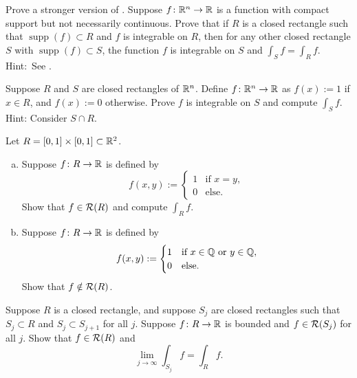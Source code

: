 \begin{exercise}
Prove a stronger version of .
Suppose $f \colon {\mathbb{R}}^n \to {\mathbb{R}}$ is a function with compact support but not
necessarily continuous.
Prove that
if $R$ is a closed rectangle such that $\operatorname{supp}(f) \subset R$
and $f$ is integrable on $R$, then for any other closed rectangle
$S$ with $\operatorname{supp}(f) \subset S$,
the function $f$ is integrable on $S$ and
$\int_S f = \int_R f$.
Hint:~See .
\end{exercise}

\begin{exercise}
Suppose $R$ and $S$ are closed rectangles of ${\mathbb{R}}^n$.
Define $f \colon {\mathbb{R}}^n \to {\mathbb{R}}$ as $f(x) := 1$ if 
$x \in R$, and $f(x) := 0$ otherwise.  Prove $f$ is integrable on $S$
and compute $\int_S f$.  Hint: Consider $S \cap R$.
\end{exercise}

\begin{samepage}
\begin{exercise}
Let $R = [0,1] \times [0,1] \subset {\mathbb{R}}^2$.
\begin{enumerate}[a)]
\item
Suppose $f \colon R \to {\mathbb{R}}$ is defined by
\begin{equation*}
f(x,y) := 
\begin{cases}
1 & \text{if } x = y, \\
0 & \text{else.}
\end{cases}
\end{equation*}
Show that $f \in {\mathcal{R}}(R)$ and compute $\int_R f$.
\item
Suppose $f \colon R \to {\mathbb{R}}$ is defined by
\begin{equation*}
f(x,y) := 
\begin{cases}
1 & \text{if } x \in {\mathbb{Q}} \text{ or } y \in {\mathbb{Q}}, \\
0 & \text{else.}
\end{cases}
\end{equation*}
Show that $f \notin {\mathcal{R}}(R)$.
\end{enumerate}
\end{exercise}
\end{samepage}

\begin{exercise}
Suppose $R$ is a closed rectangle, and suppose $S_j$ are closed rectangles
such that $S_j \subset R$ and $S_j \subset S_{j+1}$ for all $j$.
Suppose $f \colon R \to {\mathbb{R}}$ is bounded and $f \in {\mathcal{R}}(S_j)$ for all $j$.
Show that $f \in {\mathcal{R}}(R)$ and
\begin{equation*}
\lim_{j\to\infty} \int_{S_j} f = \int_R f .
\end{equation*}
\end{exercise}

